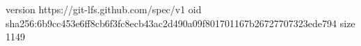 version https://git-lfs.github.com/spec/v1
oid sha256:6b9cc453e6ff8cb6f3fc8ecb43ac2d490a09f801701167b26727707323ede794
size 1149
